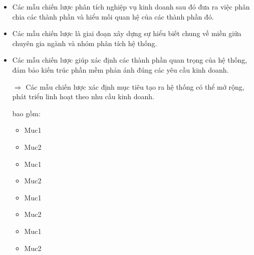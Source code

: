 \begin{itemize}

    \item Các mẫu chiến lược phân tích nghiệp vụ kinh doanh sau đó đưa ra việc phân chia các thành phần và hiểu mối quan hệ của các thành phần đó.
    
    \item Các mẫu chiến lược là giai đoạn xây dựng sự hiểu biết chung về miền giữa chuyên gia ngành và nhóm phân tích hệ thống.
    
    \item Các mẫu chiến lược giúp xác định các thành phần quan trọng của hệ thống, đảm bảo kiến trúc phần mềm phản ánh đúng các yêu cầu kinh doanh.
    
    $\Rightarrow$ Các mẫu chiến lược xác định mục tiêu tạo ra hệ thống có thể mở rộng, phát triển linh hoạt theo nhu cầu kinh doanh.
    
    bao gồm:
    
    \begin{itemize}
    
    \item Muc1 %
    
    \item Muc2 %
    
    \item Muc1 %
    
    \item Muc2 %
    
    \item Muc1 %
    
    \item Muc2 %
    
    \item Muc1 %
    
    \item Muc2 %
    
    \end{itemize}
    
    
    \end{itemize}
    
